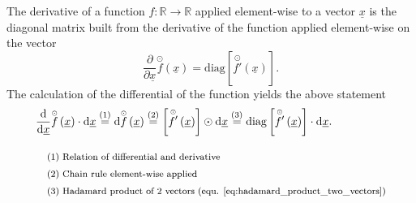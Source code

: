 The derivative of a function
$f:\mathbb{R}\rightarrow\mathbb{R}$ applied element-wise to a vector $\underline x$
is the diagonal matrix built from the derivative of the function applied element-wise on the vector
\begin{equation} \label{eq:derivative_vector_elementwise_applied_function}
        \frac{\partial}{\partial \underline x} 
        \overset{\scriptscriptstyle \odot}{f} \left(
                \underline x
            \right)
    =
        \mathrm{diag} \left[
            \overset{\scriptscriptstyle \odot}{f'}  \left(
                \underline x
            \right)
        \right].
\end{equation}
The calculation of the differential of the function yields the above statement
\begin{align}
    &\frac{\text d}{\text d \underline x}
    \overset{\scriptscriptstyle \odot}{f} \left(
        \underline x
    \right)
    \cdot \text d \underline x
\overset{\textcolor{black}{(1)}}{=}
    \text d 
    \overset{\scriptscriptstyle \odot}{f} \left(
        \underline x
    \right)
\overset{\textcolor{black}{(2)}}{=}
    \left[
        \overset{\scriptscriptstyle \odot}{f'}  \left(
            \underline x
        \right)
    \right]
    \odot \text d \underline x
\overset{\textcolor{black}{(3)}}{=}
    \mathrm{diag} \left[
        \overset{\scriptscriptstyle \odot}{f'}  \left(
            \underline x
        \right)
    \right]\cdot
    \text d \underline x.
    \\[2ex]
        &\quad\textcolor{black}{\text{\footnotesize (1) Relation of differential and derivative}} \nonumber \\
        &\quad\textcolor{black}{\text{\footnotesize (2) Chain rule element-wise applied}} \nonumber \\
        &\quad\textcolor{black}{\text{\footnotesize (3) Hadamard product of 2 vectors (equ. \ref{eq:hadamard_product_two_vectors})}}
\end{align}